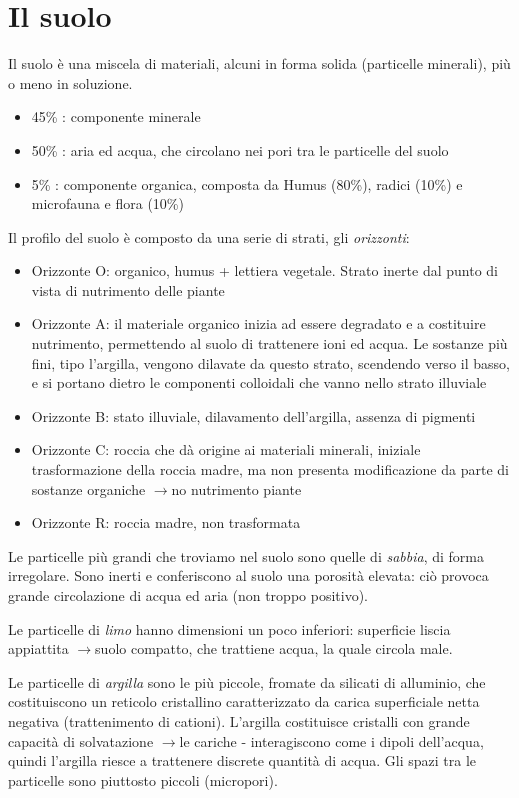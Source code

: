 \documentclass[a4paper,12pt]{book}
\newcommand{\lfreccia}{\ensuremath{\longrightarrow}}
\begin{document}
\section{Il suolo}
Il suolo è una miscela di materiali, alcuni in forma solida (particelle minerali), più o meno in soluzione.
\begin{itemize}
\item{45\% : componente minerale}
\item{50\% : aria ed acqua, che circolano nei pori tra le particelle del suolo}
\item{5\%  : componente organica, composta da Humus (80\%), radici (10\%) e microfauna e flora (10\%)}
\end{itemize}
Il profilo del suolo è composto da una serie di strati, gli \emph{orizzonti}:
\begin{itemize}
\item{Orizzonte O: organico, humus + lettiera vegetale. Strato inerte dal punto di vista di nutrimento delle piante}
\item{Orizzonte A: il materiale organico inizia ad essere degradato e a costituire nutrimento, permettendo al suolo di trattenere ioni ed acqua. Le sostanze più fini, tipo l'argilla, vengono dilavate da questo strato, scendendo verso il basso, e si portano dietro le componenti colloidali che vanno nello strato illuviale}
\item{Orizzonte B: stato illuviale, dilavamento dell'argilla, assenza di pigmenti}
\item{Orizzonte C: roccia che dà origine ai materiali minerali, iniziale trasformazione della roccia madre, ma non presenta modificazione da parte di sostanze organiche \lfreccia no nutrimento piante}
\item{Orizzonte R: roccia madre, non trasformata}
\end{itemize}

Le particelle più grandi che troviamo nel suolo sono quelle di \emph{sabbia}, di forma irregolare. Sono inerti e conferiscono al suolo una porosità elevata: ciò provoca grande circolazione di acqua ed aria (non troppo positivo).

Le particelle di \emph{limo} hanno dimensioni un poco inferiori: superficie liscia appiattita \lfreccia suolo compatto, che trattiene acqua, la quale circola male.

Le particelle di \emph{argilla }sono le più piccole, fromate da silicati di alluminio, che costituiscono un reticolo cristallino caratterizzato da carica superficiale netta negativa (trattenimento di cationi).
L'argilla costituisce cristalli con grande capacità di solvatazione \lfreccia le cariche - interagiscono come i dipoli dell'acqua, quindi l'argilla riesce a trattenere discrete quantità di acqua. Gli spazi tra le particelle sono piuttosto piccoli (micropori).
\end{document}
